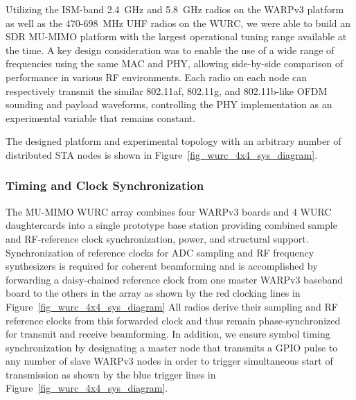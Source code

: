 	Utilizing the \ac{ISM}-band 2.4~GHz and 5.8~GHz radios on the WARPv3 platform as well as the 470-698~MHz UHF radios on the \ac{WURC}, we were able to build an \ac{SDR} \ac{MU-MIMO} platform with the largest operational tuning range available at the time.
	A key design consideration was to enable the use of a wide range of frequencies using the same \ac{MAC} and \ac{PHY}, allowing side-by-side comparison of performance in various RF environments.
		Each radio on each node can respectively transmit the similar 802.11af, 802.11g, and 802.11b-like \ac{OFDM} sounding and payload waveforms, controlling the \ac{PHY} implementation as an experimental variable that remains constant.
	
	The designed platform and experimental topology with an arbitrary number of distributed \ac{STA} nodes is shown in Figure~\ref{fig_wurc_4x4_sys_diagram}.




\subsubsection{Timing and Clock Synchronization}
	The \ac{MU-MIMO} \ac{WURC} array combines four WARPv3 boards and 4 \ac{WURC} daughtercards into a single prototype base station providing combined sample and RF-reference clock synchronization, power, and structural support.
	Synchronization of reference clocks for ADC sampling and RF frequency synthesizers is required for coherent beamforming and is accomplished by forwarding a daisy-chained reference clock from one master WARPv3 baseband board to the others in the array as shown by the red clocking lines in Figure~\ref{fig_wurc_4x4_sys_diagram}
	All radios derive their sampling and RF reference clocks from this forwarded clock and thus remain phase-synchronized for transmit and receive beamforming.
	In addition, we ensure symbol timing synchronization by designating a master node that transmits a \ac{GPIO} pulse to any number of slave WARPv3 nodes in order to trigger simultaneous start of transmission as shown by the blue trigger lines in Figure~\ref{fig_wurc_4x4_sys_diagram}.

